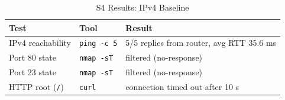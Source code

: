 \begin{table}[H]
    \centering
    \caption{S4 Results: IPv4 Baseline}
    \label{tab:s4-ipv4-baseline-results}
    \begin{tabularx}{\textwidth}{p{} p{} L}
        \toprule
        \textbf{\color{white}Test} & \textbf{\color{white}Tool} & \textbf{\color{white}Result} \\
        \midrule
        IPv4 reachability & \texttt{ping -c 5} & 5/5 replies from router, avg RTT 35.6 ms \\
        Port 80 state & \texttt{nmap -sT} & filtered (no-response) \\
        Port 23 state & \texttt{nmap -sT} & filtered (no-response) \\
        HTTP root (\texttt{/}) & \texttt{curl} & connection timed out after 10 s \\
        \bottomrule
    \end{tabularx}
\end{table}
